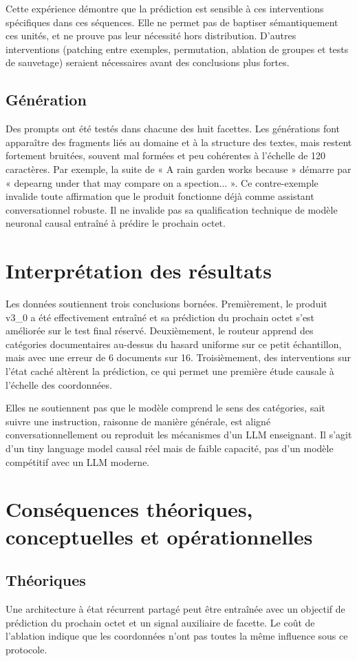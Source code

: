 \documentclass[11pt,a4paper]{article}
\begin{document}
Cette expérience démontre que la prédiction est sensible à ces interventions spécifiques dans ces séquences. Elle ne permet pas de baptiser sémantiquement ces unités, et ne prouve pas leur nécessité hors distribution. D'autres interventions (patching entre exemples, permutation, ablation de groupes et tests de sauvetage) seraient nécessaires avant des conclusions plus fortes.

\subsection{Génération}
Des prompts ont été testés dans chacune des huit facettes. Les générations font apparaître des fragments liés au domaine et à la structure des textes, mais restent fortement bruitées, souvent mal formées et peu cohérentes à l'échelle de 120 caractères. Par exemple, la suite de « A rain garden works because » démarre par « depearng under that may compare on a spection... ». Ce contre-exemple invalide toute affirmation que le produit fonctionne déjà comme assistant conversationnel robuste. Il ne invalide pas sa qualification technique de modèle neuronal causal entraîné à prédire le prochain octet.

\section{Interprétation des résultats}
Les données soutiennent trois conclusions bornées. Premièrement, le produit v3\_0 a été effectivement entraîné et sa prédiction du prochain octet s'est améliorée sur le test final réservé. Deuxièmement, le routeur apprend des catégories documentaires au-dessus du hasard uniforme sur ce petit échantillon, mais avec une erreur de 6 documents sur 16. Troisièmement, des interventions sur l'état caché altèrent la prédiction, ce qui permet une première étude causale à l'échelle des coordonnées.

Elles ne soutiennent pas que le modèle comprend le sens des catégories, sait suivre une instruction, raisonne de manière générale, est aligné conversationnellement ou reproduit les mécanismes d'un LLM enseignant. Il s'agit d'un tiny language model causal réel mais de faible capacité, pas d'un modèle compétitif avec un LLM moderne.

\section{Conséquences théoriques, conceptuelles et opérationnelles}
\subsection{Théoriques}
Une architecture à état récurrent partagé peut être entraînée avec un objectif de prédiction du prochain octet et un signal auxiliaire de facette. Le coût de l'ablation indique que les coordonnées n'ont pas toutes la même influence sous ce protocole.
\end{document}
